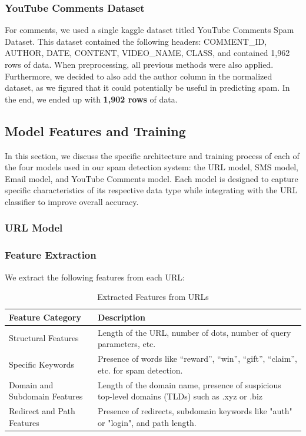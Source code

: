 \documentclass{article}
\begin{document}
\subsubsection{YouTube Comments Dataset}
For comments, we used a single kaggle dataset titled YouTube Comments Spam Dataset. This dataset contained the following headers: COMMENT\_ID, AUTHOR, DATE, CONTENT, VIDEO\_NAME, CLASS, and contained 1,962 rows of data.
\newline
\newline
\noindent
When preprocessing, all previous methods were also applied. Furthermore, we decided to also add the author column in the normalized dataset, as we figured that it could potentially be useful in predicting spam. In the end, we ended up with \textbf{1,902 rows} of data.

\subsection{Model Features and Training}

In this section, we discuss the specific architecture and training process of each of the four models used in our spam detection system: the URL model, SMS model, Email model, and YouTube Comments model. Each model is designed to capture specific characteristics of its respective data type while integrating with the URL classifier to improve overall accuracy.

\subsubsection{URL Model}

\subsubsection*{Feature Extraction}

We extract the following features from each URL:

\begin{table}[h!]
\renewcommand{\arraystretch}{1.2}
\setlength{\tabcolsep}{11pt}

\centering 
\begin{tabular}{|p{4cm}|p{10cm}|}
\hline
\textbf{Feature Category} & \textbf{Description} \\
\hline
Structural Features & Length of the URL, number of dots, number of query parameters, etc. \\
\hline
Specific Keywords & Presence of words like “reward”, “win”, “gift”, “claim”, etc. for spam detection. \\
\hline
Domain and Subdomain Features & Length of the domain name, presence of suspicious top-level domains (TLDs) such as .xyz or .biz \\
\hline
Redirect and Path Features & Presence of redirects, subdomain keywords like "auth" or "login", and path length. \\
\hline
\end{tabular}
\caption{Extracted Features from URLs}
\label{tab:url_features}
\end{table}
\end{document}
